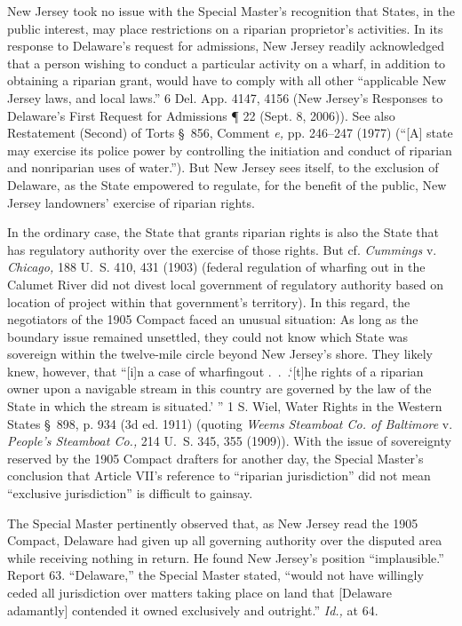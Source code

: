 {  New Jersey took no issue with the Special Master's recognition that
States, in the public interest, may place restrictions on a riparian
proprietor's activities. In its response to Delaware's request for
admissions, New Jersey readily acknowledged that a person wishing to
conduct a particular activity on a wharf, in addition to obtaining a
riparian grant, would have to comply with all other ``applicable New
Jersey \newpage  laws, and local laws.'' 6 Del. App. 4147, 4156 (New
Jersey's Responses to Delaware's First Request for Admissions ¶
22 (Sept. 8, 2006)). See also Restatement (Second) of Torts \S~856,
Comment \emph{e,} pp. 246--247 (1977) (``[A] state may exercise its
police power by controlling the initiation and conduct of riparian and
nonriparian uses of water.''). But New Jersey sees itself, to the
exclusion of Delaware, as the State empowered to regulate, for the
benefit of the public, New Jersey landowners' exercise of riparian
rights.

  In the ordinary case, the State that grants riparian rights is also
the State that has regulatory authority over the exercise of those
rights. But cf. \emph{Cummings} v. \emph{Chicago,} 188 U.~S. 410, 431
(1903) (federal regulation of wharfing out in the Calumet River did not
divest local government of regulatory authority based on location of
project within that government's territory). In this regard, the
negotiators of the 1905 Compact faced an unusual situation: As long
as the boundary issue remained unsettled, they could not know which
State was sovereign within the twelve-mile circle beyond New Jersey's
shore. They likely knew, however, that ``[i]n a case of wharfingout
.~.~.‘[t]he rights of a riparian owner upon a navigable stream
in this country are governed by the law of the State in which the
stream is situated.' '' 1 S. Wiel, Water Rights in the Western
States \S~898, p. 934 (3d ed. 1911) (quoting \emph{Weems Steamboat Co.
of Baltimore} v. \emph{People's Steamboat Co.,} 214 U.~S. 345, 355
(1909)). With the issue of sovereignty reserved by the 1905 Compact
drafters for another day, the Special Master's conclusion that
Article VII's reference to ``riparian jurisdiction'' did not mean
``exclusive jurisdiction'' is difficult to gainsay.

  The Special Master pertinently observed that, as New Jersey read the
1905 Compact, Delaware had given up all governing authority over the
disputed area while receiving nothing in return. He found New Jersey's
position ``implausible.'' Report 63. ``Delaware,'' the Special
Master stated, ``would not have willingly ceded all jurisdiction over
matters \newpage  taking place on land that [Delaware adamantly] contended
it owned exclusively and outright.'' \emph{Id.,} at 64.\footnotemark[15]

}
